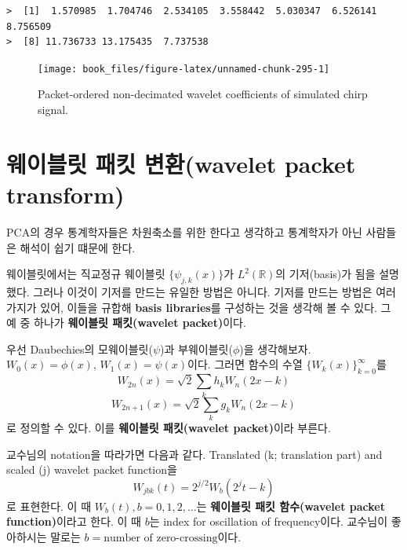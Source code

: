 \documentclass[b5paper,]{scrbook}
\makeatletter
\newenvironment{Shaded}{\begin{snugshade}}{\end{snugshade}}
\newcommand{\DataTypeTok}[1]{\textcolor[rgb]{0.13,0.29,0.53}{#1}}
\newcommand{\DecValTok}[1]{\textcolor[rgb]{0.00,0.00,0.81}{#1}}
\newcommand{\KeywordTok}[1]{\textcolor[rgb]{0.13,0.29,0.53}{\textbf{#1}}}
\newcommand{\NormalTok}[1]{#1}
\newcommand{\OperatorTok}[1]{\textcolor[rgb]{0.81,0.36,0.00}{\textbf{#1}}}
\newcommand{\StringTok}[1]{\textcolor[rgb]{0.31,0.60,0.02}{#1}}
\theoremstyle{plain}
\theoremstyle{definition}
\numberwithin{equation}{section}
\newenvironment{kframe}{%
\medskip{}
\setlength{\fboxsep}{.8em}
 \def\at@end@of@kframe{}%
 \ifinner\ifhmode%
  \def\at@end@of@kframe{\end{minipage}}%
  \begin{minipage}{\columnwidth}%
 \fi\fi%
 \def\FrameCommand##1{\hskip\@totalleftmargin \hskip-\fboxsep
 \colorbox{shadecolor}{##1}\hskip-\fboxsep
     \hskip-\linewidth \hskip-\@totalleftmargin \hskip\columnwidth}%
 \MakeFramed {\advance\hsize-\width
   \@totalleftmargin\z@ \linewidth\hsize
   \@setminipage}}%
 {\par\unskip\endMakeFramed%
 \at@end@of@kframe}
\renewenvironment{Shaded}{\begin{kframe}}{\end{kframe}}
\makeatother
\begin{document}
\begin{verbatim}
>  [1]  1.570985  1.704746  2.534105  3.558442  5.030347  6.526141  8.756509
>  [8] 11.736733 13.175435  7.737538
\end{verbatim}

\begin{Shaded}
\end{Shaded}

\begin{figure}

{\centering \texttt{[image: book\_files/figure-latex/unnamed-chunk-295-1]} 

}

\caption{Packet-ordered non-decimated wavelet coefficients of simulated chirp signal.}\label{fig:unnamed-chunk-295}
\end{figure}

\hypertarget{--wavelet-packet-transform}{%
\section{웨이블릿 패킷 변환(wavelet packet transform)}\label{--wavelet-packet-transform}}

PCA의 경우 통계학자들은 차원축소를 위한 한다고 생각하고 통계학자가 아닌 사람들은 해석이 쉽기 떄문에 한다.

웨이블릿에서는 직교정규 웨이블릿 \(\{\psi_{j,k}(x)\}\)가 \(L^{2}(\mathbb{R})\)의 기저(basis)가 됨을 설명했다. 그러나 이것이 기저를 만드는 유일한 방법은 아니다. 기저를 만드는 방법은 여러 가지가 있어, 이들을 규합해 \textbf{basis libraries}를 구성하는 것을 생각해 볼 수 있다. 그 예 중 하나가 \textbf{웨이블릿 패킷(wavelet packet)}이다.

우선 Daubechies의 모웨이블릿(\(\psi\))과 부웨이블릿(\(\phi\))을 생각해보자. \(W_{0}(x)=\phi(x)\), \(W_{1}(x)=\psi(x)\)이다. 그러면 함수의 수열 \(\{ W_{k}(x)\}_{k=0}^{\infty}\)를
\[W_{2n}(x)=\sqrt{2}\sum_{k}h_{k}W_{n}(2x-k)\]
\[W_{2n+1}(x)=\sqrt{2}\sum_{k}g_{k}W_{n}(2x-k)\]
로 정의할 수 있다. 이를 \textbf{웨이블릿 패킷(wavelet packet)}이라 부른다.

교수님의 notation을 따라가면 다음과 같다. Translated (k; translation part) and scaled (j) wavelet packet function을
\[W_{jbk}(t)=2^{j/2}W_{b}(2^{j}t-k)\]
로 표현한다. 이 때 \(W_{b}(t), b=0,1,2,\ldots\)는 \textbf{웨이블릿 패킷 함수(wavelet packet function)}이라고 한다. 이 때 \(b\)는 index for oscillation of frequency이다. 교수님이 좋아하시는 말로는 \(b= \text{number of zero-crossing}\)이다.
\end{document}

